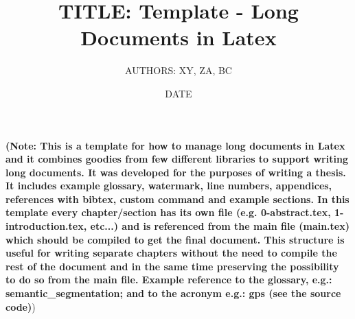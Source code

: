 \documentclass{article}
\title{TITLE: Template - Long Documents in Latex}
\author{AUTHORS: XY, ZA, BC}
\date{DATE}
\newcommand{\note}[1]{{\bf (Note: \color{blue} #1})}
\begin{document}
\maketitle
\note{This is a template for how to manage long documents in Latex and it combines goodies from few different libraries to support writing long documents. It was developed for the purposes of writing a thesis. It includes example glossary, watermark, line numbers, appendices, references with bibtex, custom command and example sections. In this template every chapter/section has its own file (e.g. 0-abstract.tex, 1-introduction.tex, etc...) and is referenced from the main file (main.tex) which should be compiled to get the final document. This structure is useful for writing separate chapters without the need to compile the rest of the document and in the same time preserving the possibility to do so from the main file. Example reference to the glossary, e.g.: \gls{semantic_segmentation}; and to the acronym e.g.: \acrfull{gps} (see the source code)}


\newpage

\newpage
\tableofcontents
\listoffigures
\listoftables
\newpage
\glsaddall
\printglossaries
\newpage










\end{document}
